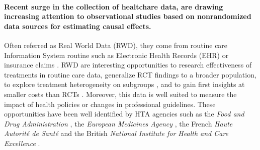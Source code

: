 

\paragraph{Recent surge in the collection of healtchare data, are drawing
    increasing attention to observational studies based on nonrandomized data
    sources for estimating causal effects.} Often referred as Real World Data
(RWD), they come from routine care Information System routine such as
Electronic Health Records (EHR) or insurance claims
\citep{wang2023emulation}. RWD are interesting opportunities to research
effectiveness of treatments in routine care data, generalize RCT findings to
a broader population, to explore treatment heterogeneity on subgroups
\citep{mant1999can, desai2021broadening}, and to gain first insights at
smaller costs than RCTs \citep{black1996we,bosdriesz2020evidence}. Moreover,
this data is well suited to measure the impact of health policies or changes
in professional guidelines. These opportunities have been well identified by
HTA agencies such as the \textit{Food and Drug Administration}
\citep{desai2021broadening,fda_real-world_2021}, the \textit{European
    Medicines Agency} \citep{flynn_marketing_2022}, the French \textit{Haute
    Autorité de Santé} \citep{vanier2023rapid} and the British \textit{National
    Institute for Health and Care Excellence} \citep{kent_nice_2022}.

